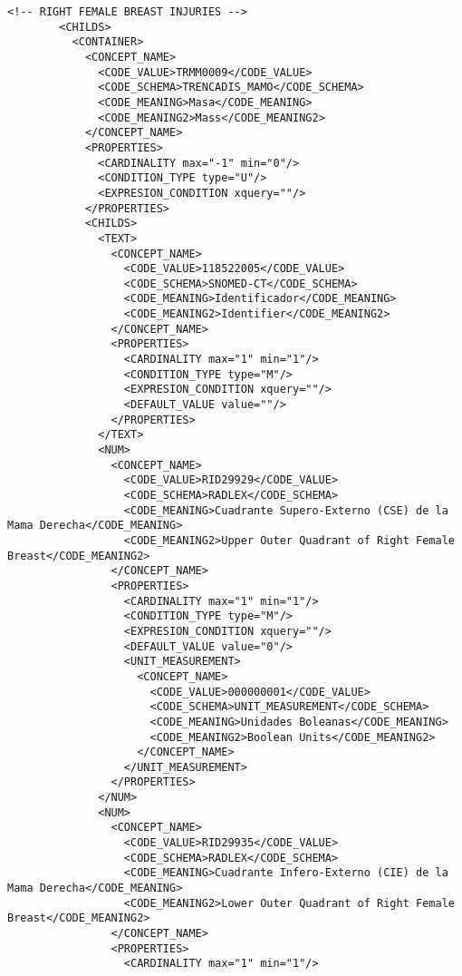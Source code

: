 \begin{lstlisting}[label=dicom-report,caption=Informe estructurado de una exploración de mama]
        <!-- RIGHT FEMALE BREAST INJURIES -->
        <CHILDS>
          <CONTAINER>
            <CONCEPT_NAME>
              <CODE_VALUE>TRMM0009</CODE_VALUE>
              <CODE_SCHEMA>TRENCADIS_MAMO</CODE_SCHEMA>
              <CODE_MEANING>Masa</CODE_MEANING>
              <CODE_MEANING2>Mass</CODE_MEANING2>
            </CONCEPT_NAME>
            <PROPERTIES>
              <CARDINALITY max="-1" min="0"/>
              <CONDITION_TYPE type="U"/>
              <EXPRESION_CONDITION xquery=""/>
            </PROPERTIES>
            <CHILDS>
              <TEXT>
                <CONCEPT_NAME>
                  <CODE_VALUE>118522005</CODE_VALUE>
                  <CODE_SCHEMA>SNOMED-CT</CODE_SCHEMA>
                  <CODE_MEANING>Identificador</CODE_MEANING>
                  <CODE_MEANING2>Identifier</CODE_MEANING2>
                </CONCEPT_NAME>
                <PROPERTIES>
                  <CARDINALITY max="1" min="1"/>
                  <CONDITION_TYPE type="M"/>
                  <EXPRESION_CONDITION xquery=""/>
                  <DEFAULT_VALUE value=""/>
                </PROPERTIES>
              </TEXT>
              <NUM>
                <CONCEPT_NAME>
                  <CODE_VALUE>RID29929</CODE_VALUE>
                  <CODE_SCHEMA>RADLEX</CODE_SCHEMA>
                  <CODE_MEANING>Cuadrante Supero-Externo (CSE) de la Mama Derecha</CODE_MEANING>
                  <CODE_MEANING2>Upper Outer Quadrant of Right Female Breast</CODE_MEANING2>
                </CONCEPT_NAME>
                <PROPERTIES>
                  <CARDINALITY max="1" min="1"/>
                  <CONDITION_TYPE type="M"/>
                  <EXPRESION_CONDITION xquery=""/>
                  <DEFAULT_VALUE value="0"/>
                  <UNIT_MEASUREMENT>
                    <CONCEPT_NAME>
                      <CODE_VALUE>000000001</CODE_VALUE>
                      <CODE_SCHEMA>UNIT_MEASUREMENT</CODE_SCHEMA>
                      <CODE_MEANING>Unidades Boleanas</CODE_MEANING>
                      <CODE_MEANING2>Boolean Units</CODE_MEANING2>
                    </CONCEPT_NAME>
                  </UNIT_MEASUREMENT>
                </PROPERTIES>
              </NUM>
              <NUM>
                <CONCEPT_NAME>
                  <CODE_VALUE>RID29935</CODE_VALUE>
                  <CODE_SCHEMA>RADLEX</CODE_SCHEMA>
                  <CODE_MEANING>Cuadrante Infero-Externo (CIE) de la Mama Derecha</CODE_MEANING>
                  <CODE_MEANING2>Lower Outer Quadrant of Right Female Breast</CODE_MEANING2>
                </CONCEPT_NAME>
                <PROPERTIES>
                  <CARDINALITY max="1" min="1"/>

\end{lstlisting}
